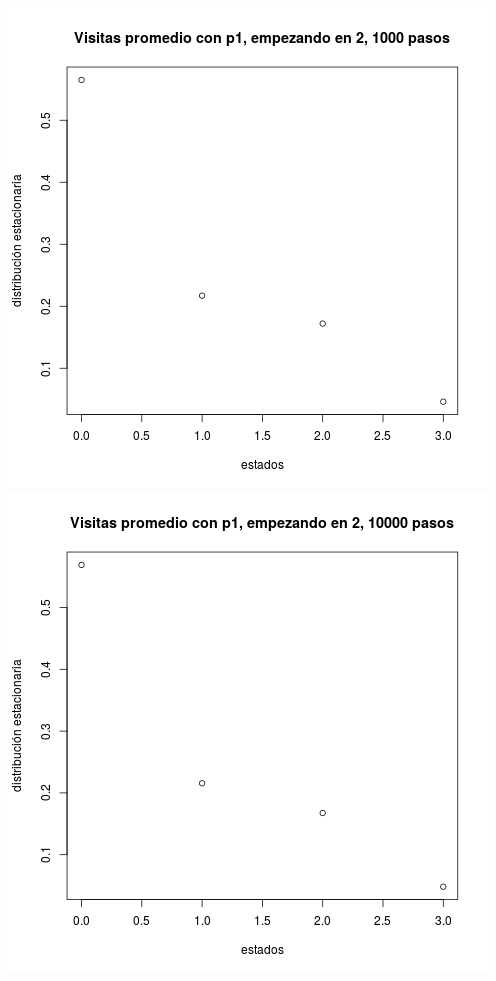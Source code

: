 \documentclass[paper=letter, fontsize=12pt]{scrartcl} %
\numberwithin{equation}{section} %
\numberwithin{figure}{section} %
\numberwithin{table}{section} %
\begin{document}
\includegraphics[scale=0.5]{ej1_2.png} \includegraphics[scale=0.5]{ej1_3.png}
\end{document}

